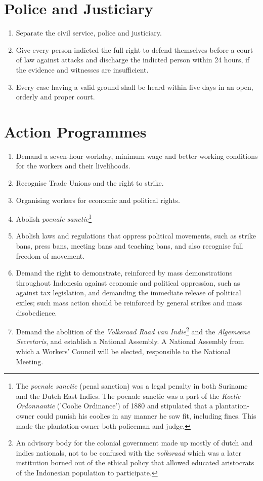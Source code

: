 \section{Police and Justiciary}

\begin{enumerate}
    \item Separate the civil service, police and justiciary.
    \item Give every person indicted the full right to defend themselves before a court of law against attacks and discharge the indicted person within 24 hours, if the evidence and witnesses are insufficient.
    \item Every case having a valid ground shall be heard within five days in an open, orderly and proper court.
\end{enumerate}

\section{Action Programmes}

\begin{enumerate}
    \item Demand a seven-hour workday, minimum wage and better working conditions for the workers and their livelihoods.
    \item Recognise Trade Unions and the right to strike.
    \item Organising workers for economic and political rights.
    \item Abolish \emph{poenale sanctie}\footnote[10]{The \emph{poenale sanctie} (penal sanction) was a legal penalty in both Suriname and the Dutch East Indies. The poenale sanctie was a part of the \emph{Koelie Ordonnantie} ('Coolie Ordinance') of 1880 and stipulated that a plantation-owner could punish his coolies in any manner he saw fit, including fines. This made the plantation-owner both policeman and judge.}
    \item Abolish laws and regulations that oppress political movements, such as strike bans, press bans, meeting bans and teaching bans, and also recognise full freedom of movement.
    \item Demand the right to demonstrate, reinforced by mass demonstrations throughout Indonesia against economic and political oppression, such as against tax legislation, and demanding the immediate release of political exiles; such mass action should be reinforced by general strikes and mass disobedience.
    \item Demand the abolition of the \emph{Volksraad Raad van Indie}\footnote[11]{An advisory body for the colonial government made up mostly of dutch and indies nationals, not to be confused with the \emph{volksraad} which was a later institution borned out of the ethical policy that allowed educated aristocrats of the Indonesian population to participate.} and the \emph{Algemeene Secretaris}, and establish a National Assembly. A National Assembly from which a Workers' Council will be elected, responsible to the National Meeting.
\end{enumerate}